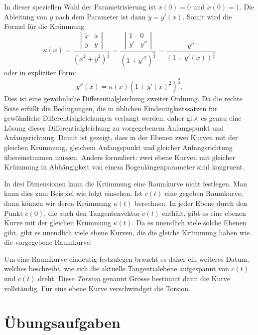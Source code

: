 
In dieser speziellen Wahl der Parametrisierung ist $x(0)=0$ und $\dot x(0)=1$.
Die Ableitung von $y$ nach dem Parameter ist dann $\dot y=y'(x)$.
Somit wird die Formel für die Krümmung
\[
\kappa(x)
=
\frac{\left|\begin{matrix}\dot x&\ddot x\\\dot y&\ddot y\end{matrix}\right|}{(\dot x^2+\dot y^2)^{\frac32}}
=
\frac{\left|\begin{matrix}1&0\\y'&y''\end{matrix}\right|}{(1+y'^2)^{\frac32}}
=
\frac{y''}{(1+y'(x))^{\frac32}}
\]
oder in expliziter Form:
\[
y''(x)=\kappa(x) (1+y'(x)^2)^{\frac32}.
\]
Dies ist eine gewöhnliche Differentialgleichung zweiter Ordnung.
Da die rechte Seite erfüllt die Bedingungen, die in üblichen
Eindeutigkeitssätzen für gewöhnliche Differentialgleichungen
verlangt werden, daher gibt es genau eine Lösung dieser
Differentialgleichung zu vorgegebenem Anfangspunkt und Anfangsrichtung.
Damit ist gezeigt, dass in der Ebenen zwei Kurven mit der gleichen
Krümmung, gleichem Anfangspunkt und gleicher Anfangsrichtung übereinstimmen
müssen.
Anders formuliert: zwei ebene Kurven mit gleicher Krümmung in Abhängigkeit
von einem Bogenlängenparameter sind kongruent.

In drei Dimensionen kann die Krümmung eine Raumkurve nicht festlegen.
Man kann dies zum Beispiel wie folgt einsehen.
Ist $c(t)$ eine gegeben Raumkurve, dann können wir deren Krümmung
$\kappa(t)$ berechnen.
In jeder Ebene durch den Punkt $c(0)$, die auch den Tangentenvektor
$\dot c(t)$ enthält, gibt es eine ebenen Kurve mit der gleichen
Krümmung $\kappa(t)$.
Da es unendlich viele solche Ebenen gibt, gibt es unendlich viele 
ebene Kurven, die die gleiche Krümmung haben wie die vorgegebene
Raumkurve.

Um eine Raumkurve eindeutig festzulegen braucht es daher ein weiteres
Datum, welches beschreibt, wie sich die aktuelle Tangentialebene
aufgespannt von $\dot c(t)$ und $\ddot c(t)$ dreht.
Diese {\em Torsion} genannt Grösse bestimmt dann die Kurve vollständig.
%
Für eine ebene Kurve verschwindget die Torsion.





\section*{Übungsaufgaben}

